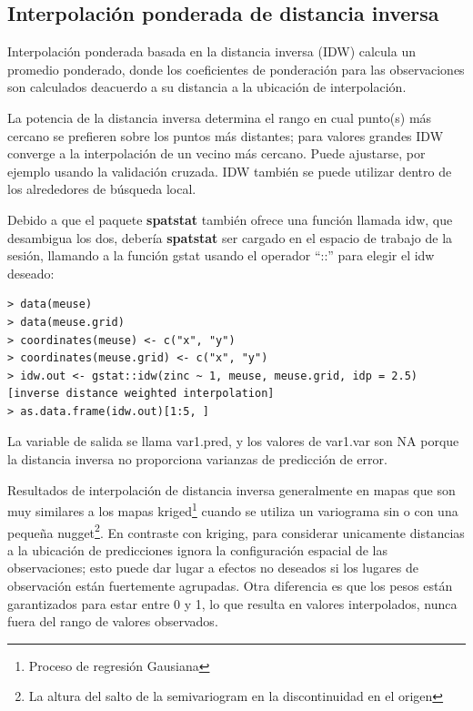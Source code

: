 \subsection{Interpolación ponderada de distancia inversa}

Interpolación ponderada basada en la distancia inversa (IDW) calcula un promedio ponderado, 
donde los coeficientes de ponderación para las observaciones son calculados deacuerdo a su distancia a la ubicación de interpolación.

La potencia de la distancia inversa determina el rango en cual punto(s)  más cercano se prefieren sobre
los puntos más distantes; para valores grandes IDW converge a la interpolación de un vecino más cercano.
Puede ajustarse, por ejemplo usando la validación cruzada. IDW también se puede utilizar dentro de los alrededores de búsqueda local.

Debido a que el paquete \textbf{spatstat} también ofrece una función llamada idw, que desambigua los dos, debería \textbf{spatstat} ser cargado
en el espacio de trabajo de la sesión, llamando a la función gstat usando el operador ``::'' para elegir el idw deseado:
\\
\begin{lstlisting}
> data(meuse)
> data(meuse.grid)
> coordinates(meuse) <- c("x", "y")
> coordinates(meuse.grid) <- c("x", "y")
> idw.out <- gstat::idw(zinc ~ 1, meuse, meuse.grid, idp = 2.5)
[inverse distance weighted interpolation]
> as.data.frame(idw.out)[1:5, ]
\end{lstlisting}

La variable de salida se llama var1.pred, y los valores de var1.var son NA
porque la distancia inversa no proporciona varianzas de predicción de error.

Resultados de interpolación de distancia inversa generalmente en mapas que son muy similares a los mapas kriged\footnote{Proceso de regresión Gausiana} 
cuando se utiliza un variograma sin o con una pequeña nugget\footnote{La altura del salto de la semivariogram en la discontinuidad en el origen}. En contraste con kriging,
para considerar unicamente distancias a la ubicación de predicciones ignora
la configuración espacial de las observaciones; esto puede dar lugar a efectos no 
deseados si los lugares de observación están fuertemente agrupadas. Otra diferencia es que los pesos están 
garantizados para estar entre 0 y 1, lo que resulta en valores interpolados, nunca fuera del rango de valores observados.

